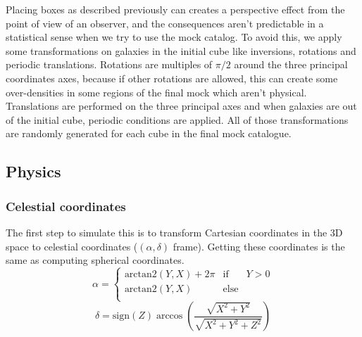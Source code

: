Placing boxes as described previously can creates a perspective effect from the
point of view of an observer, and the consequences aren't predictable in a
statistical sense when we try to use the mock catalog. To avoid this, we apply
some transformations on galaxies in the initial cube like inversions, rotations
and periodic translations. Rotations are multiples of $\pi/2$ around the three
principal coordinates axes, because if other rotations are allowed, this can
create some over-densities in some regions of the final mock which aren't
physical. Translations are performed on the three principal axes
and when galaxies are out of the initial cube, periodic conditions are applied.
All of those transformations are randomly generated for each cube in the final
mock catalogue.
%
\subsection{Physics}
%
\subsubsection{Celestial coordinates}
%
The first step to simulate this is to transform Cartesian coordinates in the
3D space to celestial coordinates ($(\alpha,\delta)$ frame). Getting these
coordinates is the same as computing spherical coordinates.
%
\begin{equation}
    \alpha=\left\{ \begin{array}{lcr}
     \mbox{arctan2}(Y,X)+2\pi & \mbox{if} & Y>0 \\
     \mbox{arctan2}(Y,X) & \mbox{else} & \\
    \end{array}\right.\nonumber%
\end{equation}
%
\begin{equation}
    \delta=\mbox{sign}(Z)\arccos\left(\frac{\sqrt{X^2+Y^2}}{\sqrt{X^2+Y^2+Z^2}}\right)
\end{equation}
%
